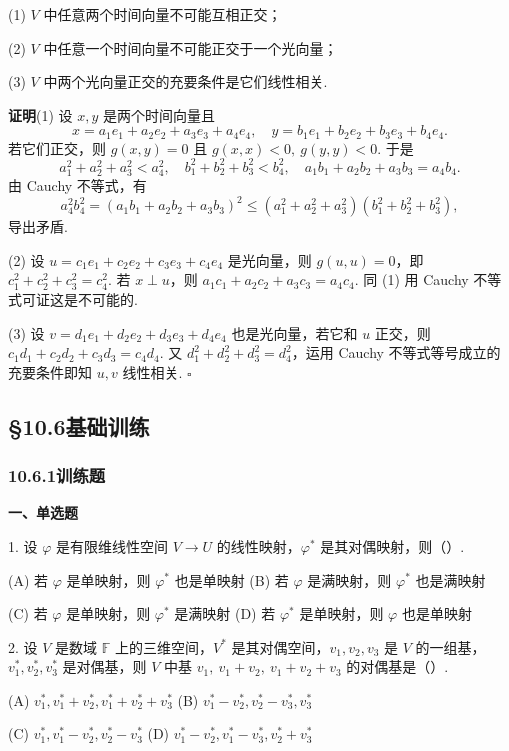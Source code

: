 \documentclass[UTF8,12pt,a4paper,fontset=fandol]{ctexart}
\begin{document}
(1) $V$ 中任意两个时间向量不可能互相正交；

(2) $V$ 中任意一个时间向量不可能正交于一个光向量；

(3) $V$ 中两个光向量正交的充要条件是它们线性相关.

\noindent\textbf{证明}\quad (1) 设 $x,y$ 是两个时间向量且
\[
x=a_1e_1+a_2e_2+a_3e_3+a_4e_4,\quad
y=b_1e_1+b_2e_2+b_3e_3+b_4e_4.
\]
若它们正交，则 $g(x,y)=0$ 且 $g(x,x)<0,\ g(y,y)<0$. 于是
\[
a_1^2+a_2^2+a_3^2<a_4^2,\quad
b_1^2+b_2^2+b_3^2<b_4^2,\quad
a_1b_1+a_2b_2+a_3b_3=a_4b_4.
\]
由 Cauchy 不等式，有
\[
a_4^2b_4^2=(a_1b_1+a_2b_2+a_3b_3)^2
\le (a_1^2+a_2^2+a_3^2)(b_1^2+b_2^2+b_3^2),
\]
导出矛盾.

(2) 设 $u=c_1e_1+c_2e_2+c_3e_3+c_4e_4$ 是光向量，则 $g(u,u)=0$，即 $c_1^2+c_2^2+c_3^2=c_4^2$. 若 $x\perp u$，则 $a_1c_1+a_2c_2+a_3c_3=a_4c_4$. 同 (1) 用 Cauchy 不等式可证这是不可能的.

(3) 设 $v=d_1e_1+d_2e_2+d_3e_3+d_4e_4$ 也是光向量，若它和 $u$ 正交，则 $c_1d_1+c_2d_2+c_3d_3=c_4d_4$. 又 $d_1^2+d_2^2+d_3^2=d_4^2$，运用 Cauchy 不等式等号成立的充要条件即知 $u,v$ 线性相关. $\square$

\subsection*{§10.6\quad 基础训练}

\subsubsection*{10.6.1\quad 训练题}

\noindent\textbf{一、单选题}

1. 设 $\varphi$ 是有限维线性空间 $V\to U$ 的线性映射，$\varphi^*$ 是其对偶映射，则（\quad ）.

(A) 若 $\varphi$ 是单映射，则 $\varphi^*$ 也是单映射
\quad
(B) 若 $\varphi$ 是满映射，则 $\varphi^*$ 也是满映射

(C) 若 $\varphi$ 是单映射，则 $\varphi^*$ 是满映射
\quad
(D) 若 $\varphi^*$ 是单映射，则 $\varphi$ 也是单映射

2. 设 $V$ 是数域 $\mathbb{F}$ 上的三维空间，$V^*$ 是其对偶空间，$v_1,v_2,v_3$ 是 $V$ 的一组基，$v_1^*,v_2^*,v_3^*$ 是对偶基，则 $V$ 中基 $v_1,\ v_1+v_2,\ v_1+v_2+v_3$ 的对偶基是（\quad ）.

(A) $v_1^*,v_1^*+v_2^*,v_1^*+v_2^*+v_3^*$
\quad
(B) $v_1^*-v_2^*,v_2^*-v_3^*,v_3^*$

(C) $v_1^*,v_1^*-v_2^*,v_2^*-v_3^*$
\quad
(D) $v_1^*-v_2^*,v_1^*-v_3^*,v_2^*+v_3^*$
\end{document}

